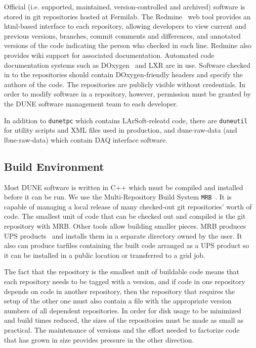 Official (i.e. supported, maintained, version-controlled and archived) software is stored in git repositories
hosted at Fermilab.  The Redmine~\cite{redmine} web tool provides an html-based interface to each repository,
allowing developers to view current and previous versions, branches, commit comments and differences, and
annotated versions of the code indicating the person who checked in each line.  Redmine also provides wiki
support for associated documentation.  Automated code documentation systems such as DOxygen~\cite{DOxygen}
and LXR are in use.  Software checked in to the repositories should contain DOxygen-friendly headers and
specify the authors of the code.  The repositories are publicly visible without credentials.  In order to
modify software in a repository, however, permission must be granted by the DUNE software management team
to each developer.

In addition to {\tt dunetpc} which contains LArSoft-releatd code, there are {\tt duneutil} for utility scripts
and XML files used in production, and dune-raw-data (and lbne-raw-data) which contain DAQ interface software.

\subsection{Build Environment}

Most DUNE software is written in C++ which must be compiled and installed before it can be run.  We use the
Multi-Repository Build System {\tt MRB}~\cite{mrb}.  It is capable of managing a local release of many checked-out
git repositories' worth of code.  The smallest unit of code that can be checked out and compiled is the git
repository with MRB.  Other tools allow building smaller pieces.  MRB produces UPS products~\cite{ups} 
and installs them in a separate directory owned by the user.  It also can produce tarfiles containing
the built code arranged as a UPS product so it can be installed in a public location or transferred to a grid job.

The fact that the repository is the smallest unit of buildable code means that each repository needs to be
tagged with a version, and if code in one repository depends on code in another repository, then the
repository that requires the setup of the other one must also contain a file with the appropriate version numbers
of all dependent repositories.  In order for disk usage to be minimized and build times reduced, the sizes 
of the repositories must be made as small as practical.  The maintenance of versions and the effort
needed to factorize code that has grown in size provides pressure in the other direction.

